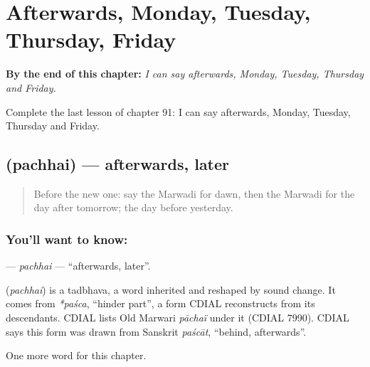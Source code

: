
\chapter{Afterwards, Monday, Tuesday, Thursday, Friday}
\label{ch:mw-afterwards-monday-tuesday-thursday-friday}

\begin{chapteropening}
\textbf{By the end of this chapter:} \emph{I can say afterwards, Monday, Tuesday, Thursday and Friday.}

Complete the last lesson of chapter 91: I can say afterwards, Monday, Tuesday, Thursday and Friday.
\end{chapteropening}

\section[\texorpdfstring{\mw{पछै} (pachhai)}{पछै (pachhai)}]{ (pachhai) — afterwards, later}

\label{lesson:MW-C91-pachhai}



\begin{quote}
Before the new one: say the Marwadi for dawn, then the Marwadi for the day after tomorrow; the day before yesterday.
\end{quote}

\subsection*{You'll want to know: }
\textbf{} — \emph{pachhai} — \textquotedblleft{}afterwards, later\textquotedblright{}.

\begin{cousinweb}
\textbf{} (\emph{pachhai}) is a tadbhava, a word inherited and reshaped by sound change. It comes from \emph{*paśca}, \textquotedblleft{}hinder part\textquotedblright{}, a form CDIAL reconstructs from its descendants. CDIAL lists Old Marwari \emph{pāchaï} under it (CDIAL 7990). CDIAL says this form was drawn from Sanskrit \emph{paścāt}, \textquotedblleft{}behind, afterwards\textquotedblright{}.
\end{cousinweb}

\begin{grammarlens}[title={What you've built}]
One more word for this chapter.
\end{grammarlens}

